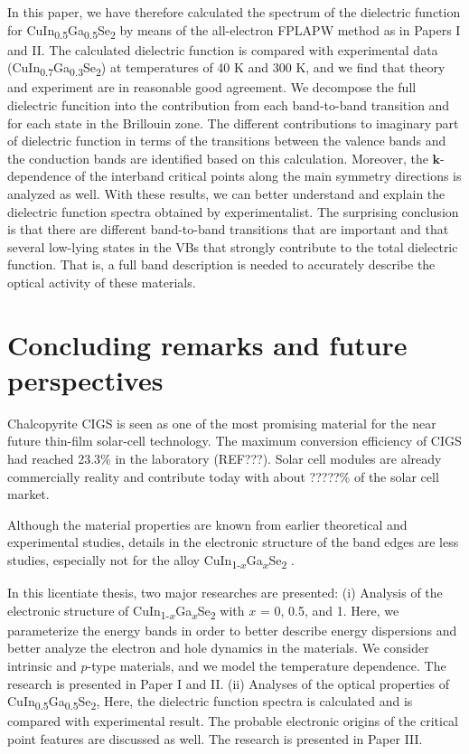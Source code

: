 \documentclass[a4paper, 12pt, titlepage,oneside,drop]{kthesis}
\begin{document}
\begin{enumerate}
\noindent In this paper, we have therefore calculated the spectrum of the dielectric function for CuIn\textsubscript{0.5}Ga\textsubscript{0.5}Se\textsubscript{2} by means of the all-electron FPLAPW method as in Papers I and II. 
The calculated dielectric function is compared with experimental data (CuIn\textsubscript{0.7}Ga\textsubscript{0.3}Se\textsubscript{2}) at temperatures of 40 K and 300 K, and we find that theory and experiment are in reasonable good agreement. We decompose the full dielectric funcition into the contribution from each band-to-band transition and for each state in the Brillouin zone.  The different contributions to imaginary part of dielectric function in terms of the transitions between the valence bands and the conduction bands are identified based on this
calculation. Moreover, the $\textbf{k}$-dependence of the interband critical points along the main symmetry directions is analyzed as well. With these results, we can better understand and explain the dielectric function spectra obtained
by experimentalist. The surprising conclusion is that there are different band-to-band transitions that are important and that several low-lying states in the VBs that strongly contribute to the total dielectric function. That is, a full band description is needed to accurately describe the optical activity of these materials. \end{enumerate}


\section{Concluding remarks and future perspectives}

\noindent Chalcopyrite CIGS is seen as one of the most promising material for the near future 
thin-film solar-cell technology. The maximum conversion efficiency of CIGS had reached 23.3\% in the 
laboratory (REF???). Solar cell modules are already commercially reality and contribute today with 
about ?????\% of the solar cell market.
 
Although the material properties are known from earlier theoretical and experimental 
studies, details in the electronic structure of the band edges are less studies, especially not for the alloy CuIn{\textsubscript{1-$x$}}Ga{\textsubscript{$x$}}Se\textsubscript{2} .

In this licentiate thesis, two major researches are presented: (i) Analysis of the electronic structure 
of CuIn{\textsubscript{1-$x$}}Ga{\textsubscript{$x$}}Se\textsubscript{2} with $x$ = 0, 0.5, and 1. 
Here, we parameterize the energy bands in order to better describe energy dispersions and better analyze 
the electron and hole dynamics in the materials. We consider intrinsic and $p$-type  materials, and we model
the temperature dependence. The research is presented in Paper I and II.
(ii) Analyses of the optical properties of CuIn{\textsubscript{0.5}}Ga{\textsubscript{0.5}}Se\textsubscript{2}, 
Here, the dielectric function spectra is calculated and is compared with experimental result. 
The probable electronic origins of the critical point features are discussed as well.
The research is presented in Paper III.
\end{document}
